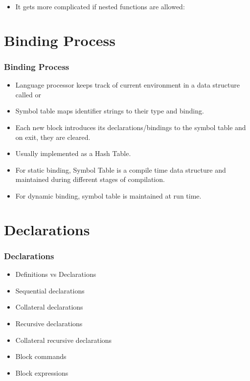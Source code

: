 \begin{frame}[fragile]
\begin{itemize}
\item It gets more complicated if nested functions are allowed:
\end{itemize}
\end{frame}

\section{Binding Process}
\begin{frame}
\frametitle{Binding Process}
\begin{itemize}
\item Language processor keeps track of current environment in a data structure called  or 
\item Symbol table maps identifier strings to their type and binding.
\item Each new block introduces its declarations/bindings to the symbol table and on exit, they are cleared.
\item Usually implemented as a Hash Table. 
\item For static binding, Symbol Table is a compile time data structure and maintained during different stages of compilation.
\item For dynamic binding, symbol table is maintained at run time.
\end{itemize}
\end{frame}

\section{Declarations}
\begin{frame}
\frametitle{Declarations}
\begin{itemize}
 \item Definitions vs Declarations
 \item Sequential declarations
 \item Collateral declarations
 \item Recursive declarations
 \item Collateral recursive declarations
 \item Block commands
 \item Block expressions
\end{itemize}
\end{frame}

